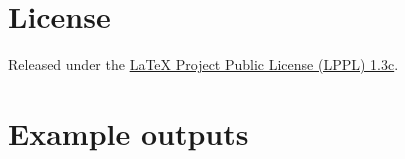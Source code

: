 \documentclass[luatex,fontsize=10pt,paper=b5,twoside]{jlreq}%
\begin{document}
\begin{quotation}

\end{quotation}

\section{License}

Released under the \href{https://www.latex-project.org/lppl/}{LaTeX Project Public License (LPPL) 1.3c}.

\clearpage\section{Example outputs}
\end{document}
